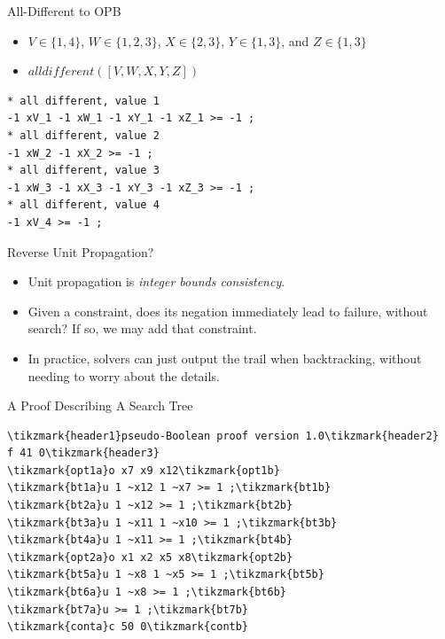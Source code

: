 \documentclass{beamer}
\begin{document}
\begin{frame}[fragile]{All-Different to OPB}
    \begin{itemize}
        \item $V \in \{ 1, 4 \}$, $W \in \{ 1, 2, 3 \}$, $X \in \{ 2, 3 \}$, $Y \in \{ 1, 3 \}$, and $Z \in \{ 1, 3 \}$
        \item $\mathit{alldifferent}([ V, W, X, Y, Z ])$
    \end{itemize}

    \begin{lstlisting}
* all different, value 1
-1 xV_1 -1 xW_1 -1 xY_1 -1 xZ_1 >= -1 ;
* all different, value 2
-1 xW_2 -1 xX_2 >= -1 ;
* all different, value 3
-1 xW_3 -1 xX_3 -1 xY_3 -1 xZ_3 >= -1 ;
* all different, value 4
-1 xV_4 >= -1 ;
\end{lstlisting}
\end{frame}

\begin{frame}{Reverse Unit Propagation?}
    \begin{itemize}
        \item Unit propagation is \emph{integer bounds consistency}.
        \item Given a constraint, does its negation immediately lead to failure, without search? If
            so, we may add that constraint.
        \item In practice, solvers can just output the trail when backtracking, without needing to
            worry about the details.
    \end{itemize}
\end{frame}

\begin{frame}[fragile]{A Proof Describing A Search Tree}%
\begin{Verbatim}[commandchars=\\\{\},codes={\catcode`$=3\catcode`^=7}]
\tikzmark{header1}pseudo-Boolean proof version 1.0\tikzmark{header2}
f 41 0\tikzmark{header3}
\tikzmark{opt1a}o x7 x9 x12\tikzmark{opt1b}
\tikzmark{bt1a}u 1 ~x12 1 ~x7 >= 1 ;\tikzmark{bt1b}
\tikzmark{bt2a}u 1 ~x12 >= 1 ;\tikzmark{bt2b}
\tikzmark{bt3a}u 1 ~x11 1 ~x10 >= 1 ;\tikzmark{bt3b}
\tikzmark{bt4a}u 1 ~x11 >= 1 ;\tikzmark{bt4b}
\tikzmark{opt2a}o x1 x2 x5 x8\tikzmark{opt2b}
\tikzmark{bt5a}u 1 ~x8 1 ~x5 >= 1 ;\tikzmark{bt5b}
\tikzmark{bt6a}u 1 ~x8 >= 1 ;\tikzmark{bt6b}
\tikzmark{bt7a}u >= 1 ;\tikzmark{bt7b}
\tikzmark{conta}c 50 0\tikzmark{contb}
\end{Verbatim}
\end{frame}
\end{document}
